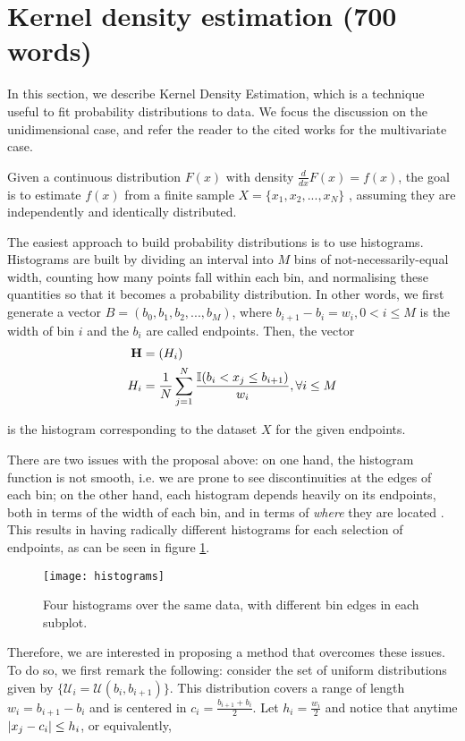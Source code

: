 \documentclass[../main.tex]{subfiles}
\begin{document}
\section{Kernel density estimation  (700 words)} \label{section_kde}
In this section, we describe Kernel Density Estimation, which is a technique useful to fit probability distributions to data. We focus the discussion on the unidimensional case, and refer the reader to the cited works for the multivariate case. 
\par Given a continuous distribution $F(x)$ with density $\frac{d}{dx}F(x) = f(x)$, the goal is to estimate $f(x)$ from a finite sample $X = \{x_1, x_2, ..., x_N\}$ \cite{Hansen2009}, assuming they are independently and identically distributed. 
\par The easiest approach to build probability distributions is to use histograms. Histograms are built by dividing an interval into $M$ bins of not-necessarily-equal width, counting how many points fall within each bin, and normalising these quantities so that it becomes a probability distribution. In other words, we first generate a vector $B = (b_0, b_1, b_2, ..., b_M)$, where $b_{i+1} - b_i = w_i, 0 < i \leq M$ is the width of bin $i$ and the $b_i$ are called endpoints. Then, the vector 
\begin{align*}
\mathbf{H} &= (H_i)\\
H_i &= \frac{1}{N}\sum_{j=1}^{N}\frac{\mathbb{I}( b_{i} < x_j \leq b_{i+1})}{w_i}, \forall i \leq M
\end{align*}
\par is the histogram corresponding to the dataset $X$ for the given endpoints.
\par There are two issues with the proposal above: on one hand, the histogram function is not smooth, i.e. we are prone to see discontinuities at the edges of each bin; on the other hand, each histogram depends heavily on its endpoints, both in terms of the width of each bin, and in terms of \emph{where} they are located \cite{Duong2004}. This results in having radically different histograms for each selection of endpoints, as can be seen in figure \ref{fig_histograms}.
\begin{figure}[t]
\centering
\texttt{[image: histograms]}
\caption{Four histograms over the same data, with different bin edges in each subplot.}
\label{fig_histograms}
\end{figure}
\par Therefore, we are interested in proposing a method that overcomes these issues. To do so, we first remark the following: consider the set of uniform distributions given by $\{\mathcal{U}_i = \mathcal{U}(b_{i}, b_{i+1})\}$. This distribution covers a range of length $w_i = b_{i+1}-b_i$ and is centered in $c_i = \frac{b_{i+1}+b_i}{2}$.  Let $h_i = \frac{w_i}{2}$ and notice that anytime $\lvert x_j - c_i\rvert \leq h_i$, or equivalently,
\end{document}
